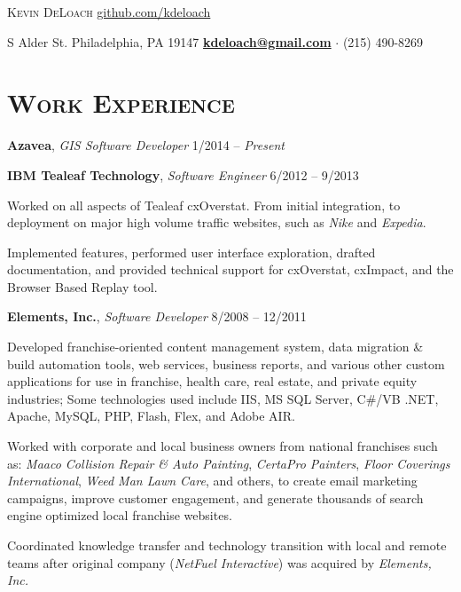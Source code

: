\documentclass[12pt,a4paper]{article}
\newcommand{\sectionhead}{\normalfont\normalsize\scshape}
\newcommand{\workhead}[3]{\textbf{#1}, \emph{#2} \hfill #3}
\newcommand{\li}{\item[--]}
\begin{document}
\noindent
{\huge \textsc{Kevin DeLoach}}
\hfill
\href{https://github.com/kdeloach}{github.com/kdeloach}

\noindent
{ S Alder St. Philadelphia, PA 19147}
\hfill
\href{mailto:kdeloach@gmail.com}{\bfseries kdeloach@gmail.com}
$\cdot$
(215) 490-8269

\section*{\sectionhead Work Experience}
\begin{description}[leftmargin=0em] 
    \itemsep0pt
    \parskip3pt
    \item
        \workhead{Azavea}{GIS Software Developer}{1/2014 -- \emph{Present}}
        \\
    \item
        \workhead{IBM Tealeaf Technology}{Software Engineer}{6/2012 -- 9/2013}
        \begin{itemize*}
            \li Worked on all aspects of Tealeaf cxOverstat. From initial integration, to deployment on major high volume traffic websites, such as \emph{Nike} and \emph{Expedia}.
            \li Implemented features, performed user interface exploration, drafted documentation, and provided technical support for cxOverstat, cxImpact, and the Browser Based Replay tool.
        \end{itemize*}

    \item 
        \workhead{Elements, Inc.}{Software Developer}{8/2008 -- 12/2011}
        \begin{itemize*}
            \li Developed franchise-oriented content management system, data migration \& build automation tools, web services, business reports, and various other custom applications for use in franchise, health care, real estate, and private equity industries; Some technologies used include IIS, MS SQL Server, C\#/VB .NET, Apache, MySQL, PHP, Flash, Flex, and Adobe AIR.
            \li Worked with corporate and local business owners from national franchises such as: \emph{Maaco Collision Repair \& Auto Painting}, \emph{CertaPro Painters}, \emph{Floor Coverings International}, \emph{Weed Man Lawn Care}, and others, to create email marketing campaigns, improve customer engagement, and generate thousands of search engine optimized local franchise websites.
            \li Coordinated knowledge transfer and technology transition with local and remote teams after original company (\emph{NetFuel Interactive}) was acquired by \emph{Elements, Inc.}
        \end{itemize*}


\end{description}
\end{document}

